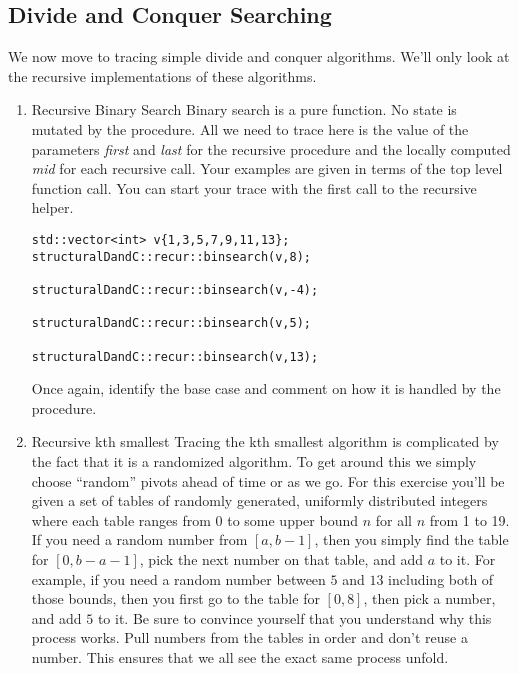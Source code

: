 \documentclass[10pt]{article}
\begin{document}
\subsection*{Divide and Conquer Searching}

We now move to tracing simple divide and conquer algorithms. We'll only look at the recursive implementations of these algorithms.

\begin{enumerate}
\item Recursive Binary Search \newline
Binary search is a pure function. No state is mutated by the procedure. All we need to trace here is the value of the parameters \textit{first} and \textit{last} for the recursive procedure and the locally computed \textit{mid} for each recursive call. Your examples are given in terms of the top level function call. You can start your trace with the first call to the recursive helper.
\begin{lstlisting}
std::vector<int> v{1,3,5,7,9,11,13};
structuralDandC::recur::binsearch(v,8);

structuralDandC::recur::binsearch(v,-4);

structuralDandC::recur::binsearch(v,5);

structuralDandC::recur::binsearch(v,13);
\end{lstlisting}
Once again, identify the base case and comment on how it is handled by the procedure.

\newpage \thispagestyle{empty}
\hspace{1in}
\newpage \thispagestyle{empty}

\item Recursive kth smallest \newline
Tracing the kth smallest algorithm is complicated by the fact that it is a randomized algorithm. To get around this we simply choose ``random'' pivots ahead of time or as we go. For this exercise you'll be given a set of tables of randomly generated, uniformly distributed integers where each table ranges from $0$ to some upper bound $n$ for all $n$ from 1 to 19.   If you need a random number from $[a,b-1]$, then you simply find the table for $[0,b-a-1]$, pick the next number on that table, and add $a$ to it. For example, if you need a random number between $5$ and $13$ including both of those bounds, then you first go to the table for $[0,8]$, then pick a number, and add $5$ to it.  Be sure to convince yourself that you understand why this process works. Pull numbers from the tables in order and don't reuse a number.  This ensures that we all see the exact same process unfold.


\end{enumerate}
\end{document}
